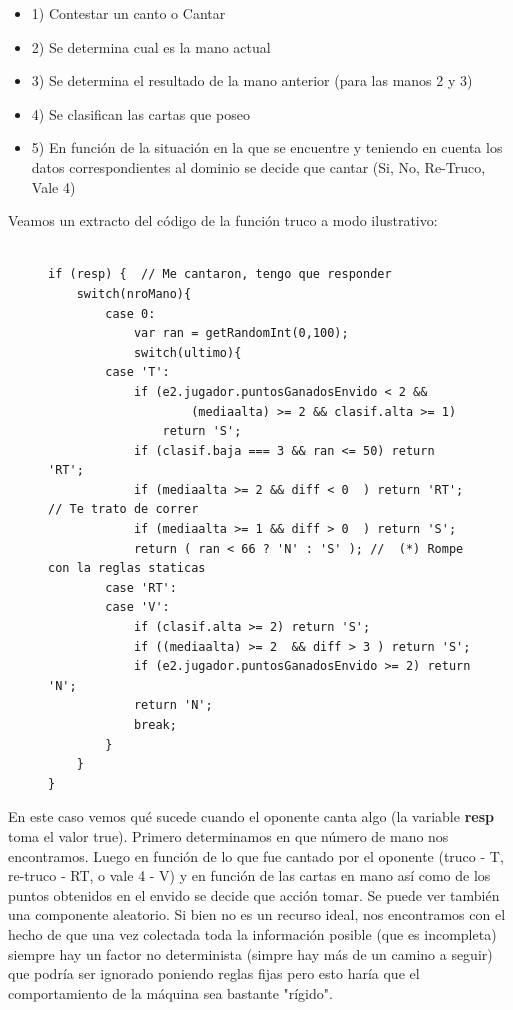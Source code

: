 \documentclass[12pt,a4paper]{article}
\begin{document}
\begin{itemize}
\item 1) Contestar un canto o Cantar
\item 2) Se determina cual es la mano actual
\item 3) Se determina el resultado de la mano anterior (para las manos 2 y 3)
\item 4) Se clasifican las cartas que poseo
\item 5) En funci\'on de la situaci\'on en la que se encuentre y teniendo en cuenta los datos correspondientes al dominio
	   se decide que cantar (Si, No, Re-Truco, Vale 4)
\end{itemize}

Veamos un extracto del c\'odigo de la funci\'on truco a modo ilustrativo:
\begin{figure}[h]
\lstset{language=java,caption=Extracto de la funci\'on truco,label=lst:nicecode}
\begin{lstlisting}

if (resp) {  // Me cantaron, tengo que responder
	switch(nroMano){
		case 0:
			var ran = getRandomInt(0,100);
			switch(ultimo){
		case 'T':
			if (e2.jugador.puntosGanadosEnvido < 2 && 
					(mediaalta) >= 2 && clasif.alta >= 1)
				return 'S';
			if (clasif.baja === 3 && ran <= 50) return 'RT'; 
			if (mediaalta >= 2 && diff < 0  ) return 'RT';  // Te trato de correr
			if (mediaalta >= 1 && diff > 0  ) return 'S';
			return ( ran < 66 ? 'N' : 'S' ); //  (*) Rompe con la reglas staticas
		case 'RT':
		case 'V':
			if (clasif.alta >= 2) return 'S';
			if ((mediaalta) >= 2  && diff > 3 ) return 'S';
			if (e2.jugador.puntosGanadosEnvido >= 2) return 'N';
			return 'N';
			break;
		}
	}
}
\end{lstlisting}
\end{figure}


\noindent En este caso vemos qu\'e sucede cuando el oponente canta algo (la variable \textbf{resp} toma el valor true). Primero determinamos
en que n\'umero de mano nos encontramos. Luego en funci\'on de lo que fue cantado por el oponente (truco - T, re-truco - RT, o vale 4 - V)
y en funci\'on de las cartas en mano as\'i como de los puntos obtenidos en el envido se decide que acci\'on tomar. Se puede ver tambi\'en
una componente aleatorio. Si bien no es un recurso ideal, nos encontramos con el hecho de que una vez colectada toda la informaci\'on posible
(que es incompleta) siempre hay un factor no determinista (simpre hay m\'as de un camino a seguir)
que podr\'ia ser ignorado poniendo reglas fijas pero esto har\'ia que el comportamiento de la m\'aquina sea bastante "r\'igido".
\end{document}
